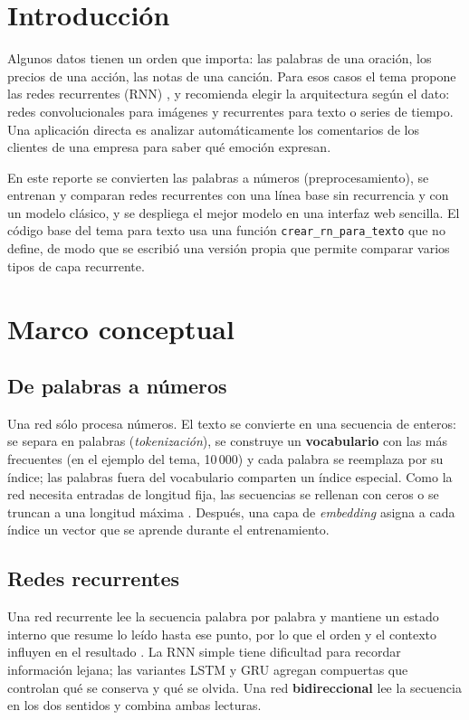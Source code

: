 \documentclass[11pt,letterpaper]{article}
\begin{document}
\portada
\indicegeneral

\section{Introducción}

Algunos datos tienen un orden que importa: las palabras de una oración, los precios de una acción, las notas de una canción. Para esos casos el tema propone las redes recurrentes (RNN) \parencite{iae_u4_t44}, y recomienda elegir la arquitectura según el dato: redes convolucionales para imágenes y recurrentes para texto o series de tiempo. Una aplicación directa es analizar automáticamente los comentarios de los clientes de una empresa para saber qué emoción expresan.

En este reporte se convierten las palabras a números (preprocesamiento), se entrenan y comparan redes recurrentes con una línea base sin recurrencia y con un modelo clásico, y se despliega el mejor modelo en una interfaz web sencilla. El código base del tema para texto usa una función \texttt{crear\_rn\_para\_texto} que no define, de modo que se escribió una versión propia que permite comparar varios tipos de capa recurrente.

\section{Marco conceptual}

\subsection{De palabras a números}

Una red sólo procesa números. El texto se convierte en una secuencia de enteros: se separa en palabras (\textit{tokenización}), se construye un \textbf{vocabulario} con las más frecuentes (en el ejemplo del tema, 10\,000) y cada palabra se reemplaza por su índice; las palabras fuera del vocabulario comparten un índice especial. Como la red necesita entradas de longitud fija, las secuencias se rellenan con ceros o se truncan a una longitud máxima \parencite{iae_u4_t44}. Después, una capa de \textit{embedding} asigna a cada índice un vector que se aprende durante el entrenamiento.

\subsection{Redes recurrentes}

Una red recurrente lee la secuencia palabra por palabra y mantiene un estado interno que resume lo leído hasta ese punto, por lo que el orden y el contexto influyen en el resultado \parencite{iae_u4_t44}. La RNN simple tiene dificultad para recordar información lejana; las variantes LSTM y GRU agregan compuertas que controlan qué se conserva y qué se olvida. Una red \textbf{bidireccional} lee la secuencia en los dos sentidos y combina ambas lecturas.
\end{document}
